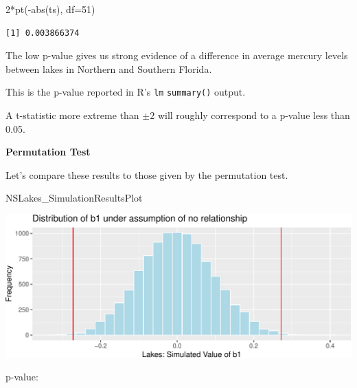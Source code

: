 \documentclass[
  letterpaper,
  DIV=11,
  numbers=noendperiod]{scrreprt}
\newenvironment{Shaded}{\begin{snugshade}}{\end{snugshade}}
\newcommand{\AttributeTok}[1]{\textcolor[rgb]{0.40,0.45,0.13}{#1}}
\newcommand{\DecValTok}[1]{\textcolor[rgb]{0.68,0.00,0.00}{#1}}
\newcommand{\DocumentationTok}[1]{\textcolor[rgb]{0.37,0.37,0.37}{\textit{#1}}}
\newcommand{\FunctionTok}[1]{\textcolor[rgb]{0.28,0.35,0.67}{#1}}
\newcommand{\NormalTok}[1]{\textcolor[rgb]{0.00,0.23,0.31}{#1}}
\newcommand{\OtherTok}[1]{\textcolor[rgb]{0.00,0.23,0.31}{#1}}
\newcommand{\SpecialCharTok}[1]{\textcolor[rgb]{0.37,0.37,0.37}{#1}}
\begin{document}
\begin{Shaded}
\begin{Highlighting}[]
\DecValTok{2}\SpecialCharTok{*}\FunctionTok{pt}\NormalTok{(}\SpecialCharTok{{-}}\FunctionTok{abs}\NormalTok{(ts), }\AttributeTok{df=}\DecValTok{51}\NormalTok{)}
\end{Highlighting}
\end{Shaded}

\begin{verbatim}
[1] 0.003866374
\end{verbatim}

The low p-value gives us strong evidence of a difference in average
mercury levels between lakes in Northern and Southern Florida.

This is the p-value reported in R's \texttt{lm} \texttt{summary()}
output.

A t-statistic more extreme than \(\pm 2\) will roughly correspond to a
p-value less than 0.05.

\textbf{Permutation Test}

Let's compare these results to those given by the permutation test.

\begin{Shaded}
\begin{Highlighting}[]
\NormalTok{NSLakes\_SimulationResultsPlot}
\end{Highlighting}
\end{Shaded}

\includegraphics{Ch4_files/figure-pdf/unnamed-chunk-61-1.pdf}

p-value:

\begin{Shaded}
\end{Shaded}
\end{document}
